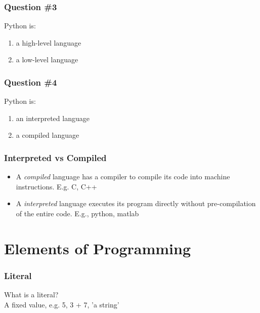 \documentclass[11pt]{beamer}
\begin{document}
\begin{frame}
  \frametitle{Question \#3}
  \Enlarge

  Python is:
  \begin{enumerate}[label=\Alph*]
  \item  a high-level language
  \item  a low-level language
  \end{enumerate}
\end{frame}

\begin{frame}
  \frametitle{Question \#4}
  \Enlarge

  Python is:
  \begin{enumerate}[label=\Alph*]
  \item  an interpreted language
  \item  a compiled language
  \end{enumerate}
\end{frame}

\begin{frame}
  \frametitle{Interpreted vs Compiled}
  \Enlarge

  \begin{itemize}
    \item A \emph{compiled} language has a compiler to compile its code into machine instructions. E.g. C, C++\\
    
    \item A \emph{interpreted} language executes its program directly without pre-compilation of the entire code.  E.g., python, matlab
  \end{itemize}

\end{frame}


\section{Elements of Programming}


\begin{frame}
  \frametitle{Literal}
  	{\Enlarge What is a literal? }\\ \pause
	A fixed value, e.g. 5, 3 + 7, 'a string'
\end{frame}
\end{document}
